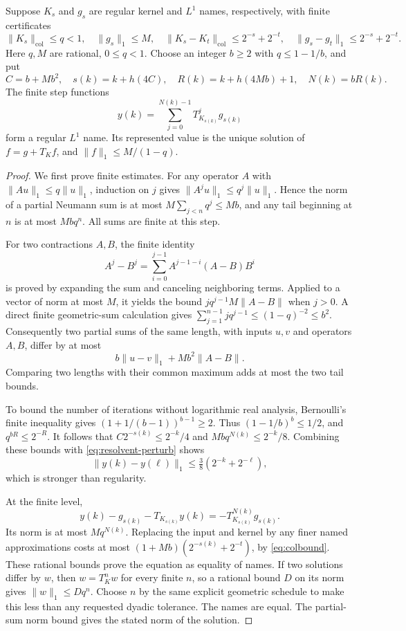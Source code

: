 \begin{theorem}\label{thm:resolvent}
Suppose \(K_s\) and \(g_s\) are regular kernel and \(L^1\) names,
respectively, with finite certificates
\[
 \|K_s\|_{\mathrm{col}}\leq q<1,\quad
 \|g_s\|_1\leq M,\quad
 \|K_s-K_t\|_{\mathrm{col}}\leq2^{-s}+2^{-t},\quad
 \|g_s-g_t\|_1\leq2^{-s}+2^{-t}.
\]
Here \(q,M\) are rational, \(0\leq q<1\). Choose an integer \(b\geq2\)
with \(q\leq1-1/b\), and put
\[
 C=b+Mb^2,\quad s(k)=k+h(4C),\quad
 R(k)=k+h(4Mb)+1,\quad N(k)=bR(k).
\]
The finite step functions
\[
 y(k)=\sum_{j=0}^{N(k)-1}T_{K_{s(k)}}^j g_{s(k)}
 \label{eq:resolvent-name}\tag{RN*}
\]
form a regular \(L^1\) name. Its represented value is the unique solution
of \(f=g+T_Kf\), and \(\|f\|_1\leq M/(1-q)\).
\end{theorem}

\begin{proof}
We first prove finite estimates. For any operator \(A\) with
\(\|Au\|_1\leq q\|u\|_1\), induction on \(j\) gives
\(\|A^ju\|_1\leq q^j\|u\|_1\). Hence the norm of a partial Neumann
sum is at most \(M\sum_{j<n}q^j\leq Mb\), and any tail beginning at
\(n\) is at most \(Mbq^n\). All sums are finite at this step.

For two contractions \(A,B\), the finite identity
\[
 A^j-B^j=\sum_{i=0}^{j-1}A^{j-1-i}(A-B)B^i
\]
is proved by expanding the sum and canceling neighboring terms. Applied
to a vector of norm at most \(M\), it yields the bound
\(j q^{j-1}M\|A-B\|\) when \(j>0\). A direct finite geometric-sum
calculation gives
\(\sum_{j=1}^{n-1}j q^{j-1}\leq(1-q)^{-2}\leq b^2\).
Consequently two partial sums of the same length, with inputs \(u,v\)
and operators \(A,B\), differ by at most
\[
 b\|u-v\|_1+Mb^2\|A-B\|.
 \tag{P}\label{eq:resolvent-perturb}
\]
Comparing two lengths with their common maximum adds at most the two
tail bounds.

To bound the number of iterations without logarithmic real analysis,
Bernoulli's finite inequality gives
\((1+1/(b-1))^{b-1}\geq2\). Thus
\((1-1/b)^b\leq1/2\), and \(q^{bR}\leq2^{-R}\).
It follows that
\(C2^{-s(k)}\leq2^{-k}/4\) and
\(Mbq^{N(k)}\leq2^{-k}/8\). Combining these bounds with
\eqref{eq:resolvent-perturb} shows
\[
 \|y(k)-y(\ell)\|_1
 \leq\tfrac38(2^{-k}+2^{-\ell}),
\]
which is stronger than regularity.

At the finite level,
\[
 y(k)-g_{s(k)}-T_{K_{s(k)}}y(k)
       =-T_{K_{s(k)}}^{N(k)}g_{s(k)}.
\]
Its norm is at most \(Mq^{N(k)}\). Replacing the input and kernel by
any finer named approximations costs at most
\((1+Mb)(2^{-s(k)}+2^{-t})\), by \eqref{eq:colbound}.
These rational bounds prove the equation as equality of names.
If two solutions differ by \(w\), then \(w=T_K^nw\) for every finite
\(n\), so a rational bound \(D\) on its norm gives
\(\|w\|_1\leq Dq^n\). Choose \(n\) by the same explicit geometric
schedule to make this less than any requested dyadic tolerance.
The names are equal. The partial-sum norm bound gives the stated norm
of the solution.
\end{proof}

